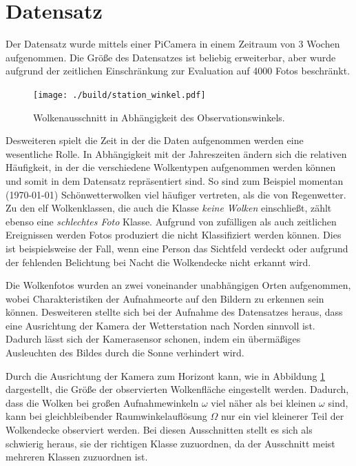 \section{Datensatz}
\label{sec:02_Datensatz}

Der Datensatz wurde mittels einer PiCamera in einem Zeitraum von 3 Wochen
aufgenommen. 
Die Größe des Datensatzes ist beliebig erweiterbar, aber wurde aufgrund der
zeitlichen Einschränkung zur Evaluation auf \num{4000} Fotos beschränkt. 

\begin{figure}
		\centering
		\vspace{-0.5cm}
		\texttt{[image: ./build/station\_winkel.pdf]}
		\caption{Wolkenausschnitt in Abhängigkeit des Observationswinkels.}
		\label{fig:theta}
		\vspace{-0.5cm}
\end{figure}
Desweiteren spielt die Zeit in der die Daten aufgenommen werden eine 
wesentliche Rolle.
In Abhängigkeit mit der Jahreszeiten ändern sich die relativen Häufigkeit, in 
der die verschiedene Wolkentypen aufgenommen werden können und somit in dem 
Datensatz repräsentiert sind. 
So sind zum Beispiel momentan (\today) Schönwetterwolken viel häufiger
vertreten, als die von Regenwetter. 
Zu den elf Wolkenklassen, die auch die Klasse \textit{keine Wolken} einschließt, 
zählt ebenso eine \textit{schlechtes Foto} Klasse. 
Aufgrund von zufälligen als auch zeitlichen Ereignissen werden Fotos produziert
die nicht Klassifiziert werden können.
Dies ist beispielsweise der Fall, wenn eine Person das Sichtfeld verdeckt oder 
aufgrund der fehlenden Belichtung bei Nacht die Wolkendecke nicht erkannt wird.

Die Wolkenfotos wurden an zwei voneinander unabhängigen Orten aufgenommen, wobei
Charakteristiken der Aufnahmeorte auf den Bildern zu erkennen sein können.
Desweiteren stellte sich bei der Aufnahme des Datensatzes heraus, dass eine
Ausrichtung der Kamera der Wetterstation nach Norden sinnvoll ist.
Dadurch lässt sich der Kamerasensor schonen, indem ein übermäßiges Ausleuchten
 des Bildes durch die Sonne verhindert wird.

Durch die Ausrichtung der Kamera zum Horizont kann, wie in Abbildung
 \ref{fig:theta} dargestellt, die Größe der observierten Wolkenfläche 
eingestellt werden.
Dadurch, dass die Wolken bei großen Aufnahmewinkeln $\omega$ viel näher als bei
kleinen $\omega$ sind, kann bei gleichbleibender Raumwinkelauflösung $\Omega$
nur ein viel kleinerer Teil der Wolkendecke observiert werden.
Bei diesen Ausschnitten stellt es sich als schwierig heraus, sie der richtigen
Klasse zuzuordnen, da der Ausschnitt meist mehreren Klassen zuzuordnen ist. 

